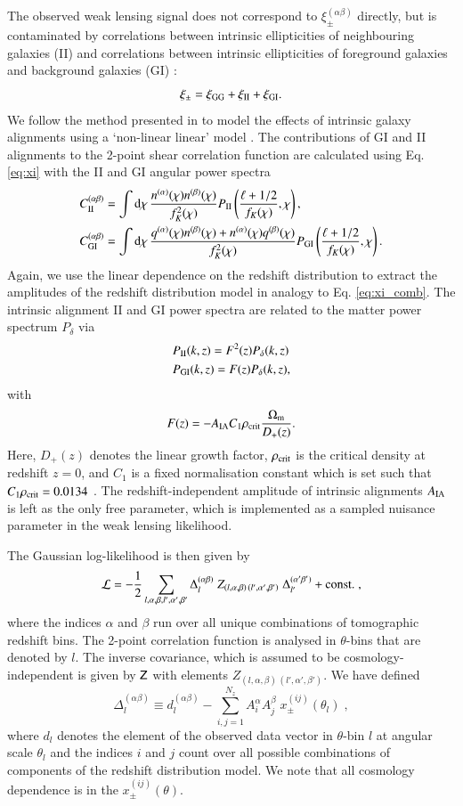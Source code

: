 \documentclass{aa}
\newcommand{\eq}[1]{\begin{equation}  #1 \end{equation}}
\newcommand{\eqa}[1]{\begin{align}   #1 \end{align}}
\newcommand{\dd}{{\rm d}}
\begin{document}
The observed weak lensing signal does not correspond to $\xi_\pm^{(\alpha\beta)}$ directly, but is contaminated by correlations between intrinsic ellipticities of neighbouring galaxies (II) and correlations between intrinsic ellipticities of foreground galaxies and background galaxies (GI) \citep{hirata04}:
\eq{
\xi_\pm = \xi_{\rm GG} + \xi_{\rm II}+ \xi_{\rm GI}.
}
We follow the method presented in \cite{hildebrandt17} to model the effects of intrinsic galaxy alignments using a `non-linear linear' model \citep{hirata04,bridle07,joachimi11}. The contributions of GI and II alignments to the 2-point shear correlation function are calculated using Eq. \eqref{eq:xi} with the II and GI angular power spectra
\eqa{
C_{\rm II}^{(\alpha\beta)} &=\int\dd\chi\,\frac{n^{(\alpha)}(\chi)n^{(\beta)}(\chi)}{f_K^2(\chi)}P_{\rm II}\left(\frac{\ell + 1/2}{f_K(\chi)},\chi\right),\\ 
C_{\rm GI}^{(\alpha\beta)} &=\int\dd\chi\,\frac{q^{(\alpha)}(\chi)n^{(\beta)}(\chi)+n^{(\alpha)}(\chi)q^{(\beta)}(\chi)}{f_K^2(\chi)}P_{\rm GI}\left(\frac{\ell + 1/2}{f_K(\chi)},\chi\right).
}
Again, we use the linear dependence on the redshift distribution to extract the amplitudes of the redshift distribution model in analogy to Eq. \eqref{eq:xi_comb}. 
The intrinsic alignment II and GI power spectra are related to the matter power spectrum $P_\delta$ via
\eqa{
&P_{\rm II}(k,z) = F^2(z) P_\delta(k,z)\label{eq:P_II}\\
&P_{\rm GI}(k,z) = F(z) P_\delta(k,z),\label{eq:P_GI}
}
with
\eq{
\label{eq:F_z}
F(z) = -A_{\rm IA}C_1\rho_{\rm crit} \frac{\Omega_{\rm m}}{D_+(z)}.
}
Here, $D_+(z)$ denotes the linear growth factor, $\rho_{\rm crit}$ is the critical density at redshift $z=0$, and $C_1$ is a fixed normalisation constant which is set such that $C_1\rho_{\rm crit} = 0.0134$ \citep{joachimi11}. The redshift-independent amplitude of intrinsic alignments $A_{\rm IA}$ is left as the only free parameter, which is implemented as a sampled nuisance parameter in the weak lensing likelihood. 

The Gaussian log-likelihood is then given by
\eq{
{\cal L} = - \frac{1}{2} \sum_{l,\alpha,\beta, l', \alpha', \beta'} \Delta_l^{(\alpha \beta)}\; Z_{(l,\alpha,\beta) \,  (l',\alpha',\beta')}\; \Delta_{l'}^{(\alpha' \beta')} + {\rm const.}\;,
}
where the indices $\alpha$ and $\beta$ run over all unique combinations of tomographic redshift bins. The 2-point correlation function is analysed in $\theta$-bins that are denoted by $l$. The inverse covariance, which is assumed to be cosmology-independent is given by $\mathsf{Z}$ with elements $Z_{(l,\alpha,\beta) \,  (l',\alpha',\beta')}$. We have defined
\eq{
\Delta_l^{(\alpha \beta)} \equiv d_l^{(\alpha \beta)} - \sum_{i,j=1}^{N_z} A_i^\alpha A_j^\beta\; x_\pm^{(ij)}(\theta_l)\;,
}
where $d_l$ denotes the element of the observed data vector in $\theta$-bin $l$ at angular scale $\theta_l$ and the indices $i$ and $j$ count over all possible combinations of components of the redshift distribution model. We note that all cosmology dependence is in the $x_\pm^{(ij)}(\theta)$.
\end{document}
